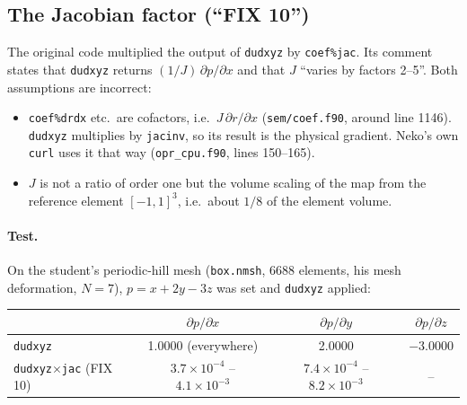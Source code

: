 \documentclass[11pt,a4paper]{article}
\newcommand{\code}[1]{\texttt{#1}}
\begin{document}
\subsection{The Jacobian factor (``FIX 10'')}
\label{sec:fix10}

The original code multiplied the output of \code{dudxyz} by
\code{coef\%jac}. Its comment states that \code{dudxyz} returns
$(1/J)\,\partial p/\partial x$ and that $J$ ``varies by factors 2--5''.
Both assumptions are incorrect:
\begin{itemize}
  \item \code{coef\%drdx} etc.\ are cofactors, i.e.\ $J\,\partial r/\partial x$
    (\code{sem/coef.f90}, around line 1146). \code{dudxyz} multiplies by
    \code{jacinv}, so its result is the physical gradient. Neko's own
    \code{curl} uses it that way (\code{opr\_cpu.f90}, lines 150--165).
  \item $J$ is not a ratio of order one but the volume scaling of the map
    from the reference element $[-1,1]^3$, i.e.\ about $1/8$ of the element
    volume.
\end{itemize}

\paragraph{Test.} On the student's periodic-hill mesh (\code{box.nmsh},
6688 elements, his mesh deformation, $N=7$), $p = x + 2y - 3z$ was set and
\code{dudxyz} applied:

\begin{center}
\small
\begin{tabular}{lccc}
\toprule
& $\partial p/\partial x$ & $\partial p/\partial y$ & $\partial p/\partial z$ \\
\midrule
\code{dudxyz} & 1.0000 (everywhere) & 2.0000 & $-3.0000$ \\
\code{dudxyz}$\times$\code{jac} (FIX 10) & $3.7\times10^{-4}$ -- $4.1\times10^{-3}$ & $7.4\times10^{-4}$ -- $8.2\times10^{-3}$ & -- \\
\bottomrule
\end{tabular}
\end{center}
\end{document}
